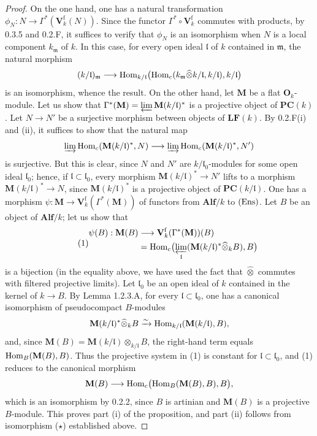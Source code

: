 \begin{proof}
On the one hand, one has a natural transformation $\phi_N:N\to\Gamma^*(\mathbf V_k^{\mathrm f}(N))$. Since the functor $\Gamma^*\circ\mathbf V_k^{\mathrm f}$ commutes with products, by 0.3.5 and 0.2.F, it suffices to verify that $\phi_N$ is an isomorphism when $N$ is a local component $k_{\mathfrak m}$ of $k$. In this case, for every open ideal $\mathfrak l$ of $k$ contained in $\mathfrak m$, the natural morphism
\[
(k/\mathfrak l)_{\mathfrak m}\longrightarrow\operatorname{Hom}_{k/\mathfrak l}\bigl(\operatorname{Hom}_c(k_{\mathfrak m}\widehat\otimes k/\mathfrak l,k/\mathfrak l),k/\mathfrak l\bigr)
\]
is an isomorphism, whence the result.
On the other hand, let $\mathbf M$ be a flat $\mathbf O_k$-module. Let us show that $\Gamma^*(\mathbf M)=\varprojlim\mathbf M(k/\mathfrak l)^*$ is a projective object of $\mathbf{PC}(k)$. Let $N\to N'$ be a surjective morphism between objects of $\mathbf{LF}(k)$. By 0.2.F(i) and (ii), it suffices to show that the natural map
\[
\varinjlim\operatorname{Hom}_c(\mathbf M(k/\mathfrak l)^*,N)\longrightarrow\varinjlim\operatorname{Hom}_c(\mathbf M(k/\mathfrak l)^*,N')
\]
is surjective. But this is clear, since $N$ and $N'$ are $k/\mathfrak l_0$-modules for some open ideal $\mathfrak l_0$; hence, if $\mathfrak l\subset\mathfrak l_0$, every morphism $\mathbf M(k/\mathfrak l)^*\to N'$ lifts to a morphism $\mathbf M(k/\mathfrak l)^*\to N$, since $\mathbf M(k/\mathfrak l)^*$ is a projective object of $\mathbf{PC}(k/\mathfrak l)$.
One has a morphism $\psi:\mathbf M\to\mathbf V_k^{\mathrm f}(\Gamma^*(\mathbf M))$ of functors from $\mathbf{Alf}/k$ to $\textup{(Ens)}$. Let $B$ be an object of $\mathbf{Alf}/k$; let us show that
\begin{equation}\tag{1}
\begin{aligned}
\psi(B):\mathbf M(B)&\longrightarrow\mathbf V_k^{\mathrm f}(\Gamma^*(\mathbf M))(B)\\
&=\operatorname{Hom}_c\bigl(\varprojlim_{\mathfrak l}(\mathbf M(k/\mathfrak l)^*\widehat\otimes_k B),B\bigr)
\end{aligned}
\end{equation}
is a bijection (in the equality above, we have used the fact that $\widehat\otimes$ commutes with filtered projective limits). Let $\mathfrak l_0$ be an open ideal of $k$ contained in the kernel of $k\to B$. By Lemma 1.2.3.A, for every $\mathfrak l\subset\mathfrak l_0$, one has a canonical isomorphism of pseudocompact $B$-modules
\[
\mathbf M(k/\mathfrak l)^*\widehat\otimes_k B\xrightarrow{\sim}\operatorname{Hom}_{k/\mathfrak l}(\mathbf M(k/\mathfrak l),B),
\]
and, since $\mathbf M(B)=\mathbf M(k/\mathfrak l)\otimes_{k/\mathfrak l}B$, the right-hand term equals $\operatorname{Hom}_B(\mathbf M(B),B)$. Thus the projective system in (1) is constant for $\mathfrak l\subset\mathfrak l_0$, and (1) reduces to the canonical morphism
\[
\mathbf M(B)\longrightarrow\operatorname{Hom}_c\bigl(\operatorname{Hom}_B(\mathbf M(B),B),B\bigr),
\]
which is an isomorphism by 0.2.2, since $B$ is artinian and $\mathbf M(B)$ is a projective $B$-module. This proves part (i) of the proposition, and part (ii) follows from isomorphism ($\star$) established above.
\end{proof}
